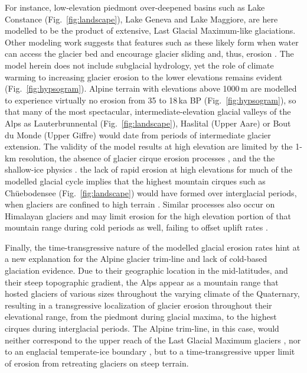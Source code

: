 \documentclass[esurf, manuscript]{copernicus}
\begin{document}
    For instance, low-elevation piedmont over-deepened basins such as Lake
    Constance (Fig.~\ref{fig:landscape}), Lake Geneva and Lake Maggiore, are
    here modelled to be the product of extensive, Last Glacial Maximum-like
    glaciations. Other modeling work suggests that features such as these
    likely form when water can access the glacier bed and encourage glacier
    sliding and, thus, erosion \citep{Herman.etal.2011}. The model herein does
    not include subglacial hydrology, yet the role of climate warming to
    increasing glacier erosion to the lower elevations remains evident
    (Fig.~\ref{fig:hypsogram}).
    Alpine terrain with elevations above 1000\,m are modelled to
    experience virtually no erosion from 35 to 18\,ka BP
    (Fig.~\ref{fig:hypsogram}), so that many of the most spectacular,
    intermediate-elevation glacial valleys of the Alps as Lauterbrunnental
    (Fig.~\ref{fig:landscape}), Haslital (Upper Aare) or Bout du Monde (Upper
    Giffre) would date from periods of intermediate glacier extension.
    The validity of the model results at high elevation are limited by the 1-km
    resolution, the absence of glacier cirque erosion processes
    \citep[cf.][]{Sanders.etal.2012}, and the the shallow-ice physics
    \citep{Imhof.etal.2019}.
    the lack of rapid erosion at high elevations for much
    of the modelled glacial cycle implies that the highest mountain
    cirques such as Ch\"uebodensee (Fig.~\ref{fig:landscape}) would have formed
    over interglacial periods, when glaciers are confined to high terrain
    \citep{Barr.etal.2017, Barr.etal.2019}. Similar processes also occur on
    Himalayan glaciers and may limit erosion for the high elevation portion of
    that mountain range during cold periods as well, failing to offset uplift
    rates \citep{Harper.Humphrey.2003}.

    Finally, the time-transgressive nature of the modelled glacial erosion
    rates hint at a new explanation for the Alpine glacier trim-line and lack
    of cold-based glaciation evidence. Due to their geographic location in the
    mid-latitudes, and their steep topographic gradient, the Alps appear as a
    mountain range that hosted glaciers of various sizes throughout the varying
    climate of the Quaternary, resulting in a transgressive localization of
    glacier erosion throughout their elevational range, from the piedmont
    during glacial maxima, to the highest cirques during interglacial periods.
    The Alpine trim-line, in this case, would neither correspond to the upper
    reach of the Last Glacial Maximum glaciers \citep[e.g.,][]{Kelly.etal.2004},
    nor to an englacial temperate-ice boundary \citep{Coutterand.2010,
    Seguinot.etal.2018}, but to a time-transgressive upper limit of erosion from
    retreating glaciers on steep terrain.
\end{document}
